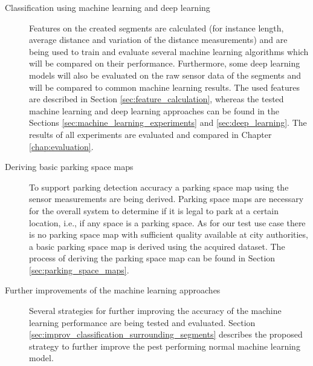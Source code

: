 \begin{description}
\item[Classification using machine learning and deep learning] Features on the created segments are calculated (for instance length, average distance and variation of the distance measurements) and are being used to train and evaluate several machine learning algorithms which will be compared on their performance. Furthermore, some deep learning models will also be evaluated on the raw sensor data of the segments and will be compared to common machine learning results. The used features are described in Section \ref{sec:feature_calculation}, whereas the tested machine learning and deep learning approaches can be found in the Sections \ref{sec:machine_learning_experiments} and \ref{sec:deep_learning}. The results of all experiments are evaluated and compared in Chapter \ref{chap:evaluation}.

\item[Deriving basic parking space maps] To support parking detection accuracy a parking space map using the sensor measurements are being derived. Parking space maps are necessary for the overall system to determine if it is legal to park at a certain location, i.e., if any space is a parking space. As for our test use case there is no parking space map with sufficient quality available at city authorities, a basic parking space map is derived using the acquired dataset. The process of deriving the parking space map can be found in Section \ref{sec:parking_space_maps}.

\item[Further improvements of the machine learning approaches] Several strategies for further improving the accuracy of the machine learning performance are being tested and evaluated. Section \ref{sec:improv_classification_surrounding_segments} describes the proposed strategy to further improve the pest performing normal machine learning model.


\end{description}


